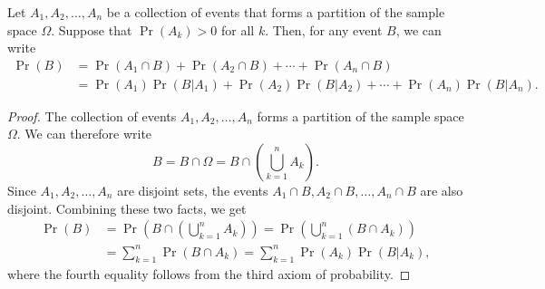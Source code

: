 \begin{theorem} \label{theorem:TotalProbability} 
Let $A_1, A_2, \ldots, A_n$ be a collection of events that forms a partition of the sample space $\Omega$.
Suppose that $\Pr (A_k) > 0$ for all $k$.
Then, for any event $B$, we can write
\begin{equation*}
\begin{split}
\Pr (B) &= \Pr (A_1 \cap B) + \Pr (A_2 \cap B) + \cdots + \Pr (A_n \cap B) \\
&= \Pr (A_1) \Pr (B | A_1) + \Pr (A_2) \Pr (B | A_2) + \cdots + \Pr (A_n) \Pr (B | A_n ) .
\end{split}
\end{equation*}
\end{theorem}
\begin{proof}
The collection of events $A_1, A_2, \ldots, A_n$ forms a partition of the sample space $\Omega$.
We can therefore write
\begin{equation*}
B = B \cap \Omega = B \cap \left( \bigcup_{k=1}^n A_k \right) .
\end{equation*}
Since $A_1, A_2, \ldots, A_n$ are disjoint sets, the events $A_1 \cap B, A_2 \cap B, \ldots, A_n \cap B$ are also disjoint.
Combining these two facts, we get
\begin{equation*}
\begin{split}
\Pr (B)
&= \Pr \left( B \cap \left( \bigcup_{k=1}^n A_k \right) \right)
= \Pr \left( \bigcup_{k=1}^n (B \cap A_k) \right) \\
&= \sum_{k=1}^n \Pr \left( B \cap A_k \right)
= \sum_{k=1}^n \Pr (A_k) \Pr \left( B |A_k \right) ,
\end{split}
\end{equation*}
where the fourth equality follows from the third axiom of probability.
\end{proof}

